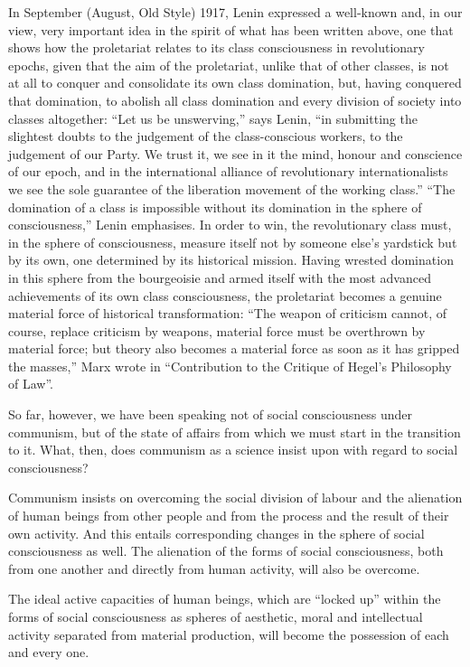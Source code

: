 \documentclass[12pt,a4paper,openany]{book}
\begin{document}
In September (August, Old Style) 1917, Lenin expressed a well-known and, in our view, very important idea in the spirit of what has been written above, one that shows how the proletariat relates to its class consciousness in revolutionary epochs, given that the aim of the proletariat, unlike that of other classes, is not at all to conquer and consolidate its own class domination, but, having conquered that domination, to abolish all class domination and every division of society into classes altogether: “Let us be unswerving,” says Lenin, “in submitting the slightest doubts to the judgement of the class-conscious workers, to the judgement of our Party. We trust it, we see in it the mind, honour and conscience of our epoch, and in the international alliance of revolutionary internationalists we see the sole guarantee of the liberation movement of the working class.” “The domination of a class is impossible without its domination in the sphere of consciousness,” Lenin emphasises. In order to win, the revolutionary class must, in the sphere of consciousness, measure itself not by someone else’s yardstick but by its own, one determined by its historical mission. Having wrested domination in this sphere from the bourgeoisie and armed itself with the most advanced achievements of its own class consciousness, the proletariat becomes a genuine material force of historical transformation: “The weapon of criticism cannot, of course, replace criticism by weapons, material force must be overthrown by material force; but theory also becomes a material force as soon as it has gripped the masses,” Marx wrote in “Contribution to the Critique of Hegel’s Philosophy of Law”.

So far, however, we have been speaking not of social consciousness under communism, but of the state of affairs from which we must start in the transition to it. What, then, does communism as a science insist upon with regard to social consciousness?

Communism insists on overcoming the social division of labour and the alienation of human beings from other people and from the process and the result of their own activity. And this entails corresponding changes in the sphere of social consciousness as well. The alienation of the forms of social consciousness, both from one another and directly from human activity, will also be overcome.

The ideal active capacities of human beings, which are “locked up” within the forms of social consciousness as spheres of aesthetic, moral and intellectual activity separated from material production, will become the possession of each and every one.
\end{document}
